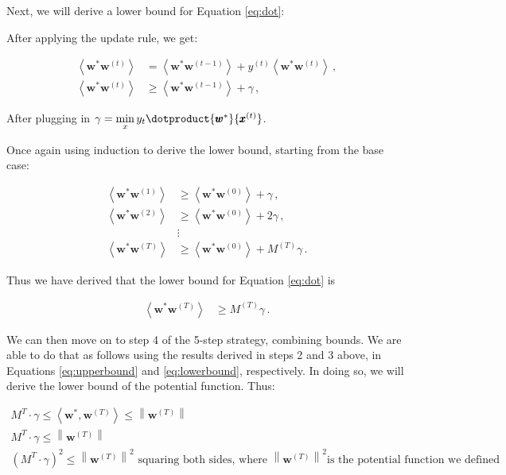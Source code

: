 \documentclass[11pt]{article}
\begin{document}
Next, we will derive a lower bound for Equation \ref{eq:dot}:

After applying the update rule, we get:

\begin{align}
    \left\langle\pmb{w}^{*} \pmb{w}^{(t)} \right\rangle &= \left\langle\pmb{w}^{*} \pmb{w}^{(t-1)} \right\rangle + y^{(t)} \left\langle\pmb{w}^{*} \pmb{w}^{(t)} \right\rangle\, , \\
    \left\langle\pmb{w}^{*} \pmb{w}^{(t)} \right\rangle &\ge \left\langle\pmb{w}^{*} \pmb{w}^{(t-1)} \right\rangle + \gamma \, ,
    \label{eq:17}
\end{align}

After plugging in $\gamma = \underset{x}{\mathrm{min}} \, y_{t} \dotproduct{\pmb{w}^{*}}{\pmb{x}^{(t)}}$. 

Once again using induction to derive the lower bound, starting from the base case:

\begin{align}
    \left\langle\pmb{w}^{*} { \pmb{w}^{(1)} } \right\rangle &\ge \left\langle\pmb{w}^{*} { \pmb{w}^{(0)} } \right\rangle + \gamma \, , \nonumber \\
    \left\langle\pmb{w}^{*} { \pmb{w}^{(2)} } \right\rangle &\ge \left\langle\pmb{w}^{*} { \pmb{w}^{(0)} } \right\rangle + 2 \gamma \, , \nonumber \\
    &\vdots \nonumber \\
    \left\langle\pmb{w}^{*} { \pmb{w}^{(T)} } \right\rangle &\ge \left\langle\pmb{w}^{*} { \pmb{w}^{(0)} } \right\rangle + M^{(T)} \gamma \, .
\end{align}

Thus we have derived that the lower bound for Equation \ref{eq:dot} is 

\begin{align}
    \left\langle\pmb{w}^{*} { \pmb{w}^{(T)} } \right\rangle &\ge M^{(T)} \gamma \, . \label{eq:lowerbound}
\end{align}

We can then move on to step 4 of the 5-step strategy, combining bounds. We are able to do that as follows using the results derived in steps 2 and 3 above, in Equations \ref{eq:upperbound} and \ref{eq:lowerbound}, respectively. In doing so, we will derive the lower bound of the potential function. Thus:

\begin{align}
    M^{T} \cdot \gamma \leq 
    \left\langle\boldsymbol{w}^{*}, \boldsymbol{w}^{(T)}\right\rangle
    \leq \left\|\boldsymbol{w}^{(T)}\right\| \\
    M^{T} \cdot \gamma \leq \left\|\boldsymbol{w}^{(T)}\right\| \\
    {(M^{T} \cdot \gamma)}^{2} \leq {\left\|\boldsymbol{w}^{(T)}\right\|}^{2} \text { squaring both sides, where } {\left\|\boldsymbol{w}^{(T)}\right\|}^{2} \text{is the potential function we defined}
     \label{eq:23}
\end{align}
\end{document}

